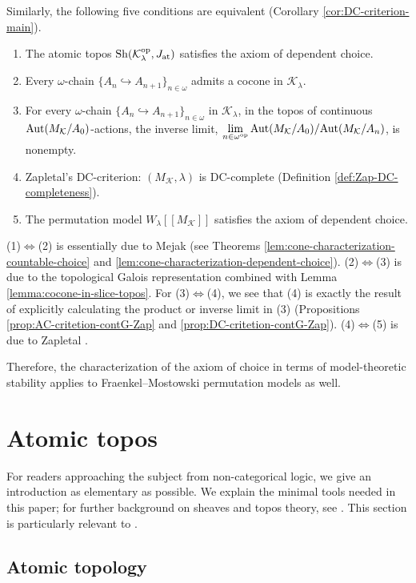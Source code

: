 \documentclass[10pt]{amsart}
\numberwithin{equation}{section}
\theoremstyle{plain}
\theoremstyle{definition}
\newcommand{\om}{\omega}
\newcommand{\K}{\mathcal{K}}
\newcommand{\embed}{\hookrightarrow}
\begin{document}
Similarly, the following five conditions are equivalent (Corollary \ref{cor:DC-criterion-main}).
\begin{enumerate}
\item The atomic topos ${\rm Sh}(\K_\lambda^{\rm op},J_{\rm at})$ satisfies the axiom of dependent choice.
\item Every $\om$-chain $\{A_n\embed A_{n+1}\}_{n\in\om}$ admits a cocone in $\K_\lambda$. 
\item For every $\om$-chain $\{A_n\embed A_{n+1}\}_{n\in\om}$ in $\K_\lambda$, in the topos of continuous ${\rm Aut}(M_\K/A_0)$-actions, the inverse limit, 
$\displaystyle{\lim_{n\in\om^{\rm op}}{\rm Aut}(M_\K/A_0)/{\rm Aut}(M_\K/A_n)}$, is nonempty.
\item Zapletal's DC-criterion: $(M_\K,\lambda)$ is DC-complete (Definition \ref{def:Zap-DC-completeness}).
\item The permutation model $W_\lambda[[M_\K]]$ satisfies the axiom of dependent choice.
\end{enumerate}

(1)$\Leftrightarrow$(2) is essentially due to Mejak \cite{Mej19} (see Theorems \ref{lem:cone-characterization-countable-choice} and \ref{lem:cone-characterization-dependent-choice}).
(2)$\Leftrightarrow$(3) is due to the topological Galois representation \cite{Car16,CaLa19} combined with Lemma \ref{lemma:cocone-in-slice-topos}.
For (3)$\Leftrightarrow$(4), we see that (4) is exactly the result of explicitly calculating the product or inverse limit in (3) (Propositions \ref{prop:AC-critetion-contG-Zap} and \ref{prop:DC-critetion-contG-Zap}).
(4)$\Leftrightarrow$(5) is due to Zapletal \cite{Zap26}.



Therefore, the characterization of the axiom of choice in terms of model-theoretic stability applies to Fraenkel--Mostowski permutation models as well.

\section{Atomic topos}

For readers approaching the subject from non-categorical logic, we give an introduction as elementary  as possible.
We explain the minimal tools needed in this paper; for further background on sheaves and topos theory, see \cite{Elephant,Elephant2,SGL}.
This section is particularly relevant to \cite[C3.5]{Elephant2}.

\subsection{Atomic topology}
\end{document}
